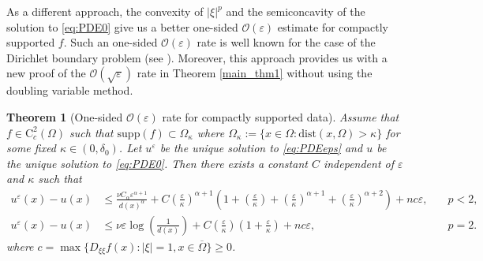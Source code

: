 \documentclass[12pt,reqno]{amsart}
\numberwithin{figure}{section}
\theoremstyle{plain}
\newtheorem{thm}{Theorem}[section]
\theoremstyle{remark}
\numberwithin{equation}{section}
\begin{document}
As a different approach, the convexity of $|\xi|^p$ and the semiconcavity of the solution to \eqref{eq:PDE0} give us a better one-sided $\mathcal{O}(\varepsilon)$ estimate for compactly supported $f$. Such an one-sided $\mathcal{O}(\varepsilon)$ rate is well known for the case of the Dirichlet boundary problem (see \cite{Bardi1997,tran_hamilton-jacobi_2021}). Moreover, this approach provides us with a new proof of the $\mathcal{O}(\sqrt{\varepsilon})$ rate in Theorem \ref{main_thm1} without using the doubling variable method.



\begin{thm}[One-sided $\mathcal{O}(\varepsilon)$ rate for compactly supported data]\label{thm:rate_doubling2} Assume that $f\in \mathrm{C}^2_c(\Omega)$ such that $\mathrm{supp}(f)\subset\Omega_\kappa$ where  $\Omega_\kappa := \{x\in \Omega: \mathrm{dist}(x,\Omega) > \kappa\}$ for some fixed $\kappa \in (0, \delta_{0})$. Let $u^\varepsilon$ be the unique solution to \eqref{eq:PDEeps} and $u$ be the unique solution to \eqref{eq:PDE0}. Then there exists a constant $C$ independent of $\varepsilon$ and $\kappa$ such that
\begin{equation*}
\begin{aligned}
    u^\varepsilon(x) - u(x) &\leq\frac{\nu C_\alpha \varepsilon^{\alpha+1}}{d(x)^\alpha} + C\left(\frac{\varepsilon}{\kappa}\right)^{\alpha+1} \left(1+ \left(\frac{\varepsilon}{\kappa}\right) +\left(\frac{\varepsilon}{\kappa}\right)^{\alpha+1} +\left(\frac{\varepsilon}{\kappa}\right)^{\alpha+2}\right) + nc\varepsilon,  &\quad p <2, \\
    u^\varepsilon(x) - u(x) & \leq \nu \varepsilon \log\left( \frac{1}{d(x)}\right)+C\left(\frac{\varepsilon}{\kappa}\right) \left(1+\frac{\varepsilon}{\kappa}\right)+ nc \varepsilon, &\quad p=2.
\end{aligned}
\end{equation*}
where $c = \max \big\lbrace  D_{\xi\xi}f(x): |\xi|=1, x\in \overline{\Omega} \big\rbrace\geq 0$.
\end{thm}
\end{document}
